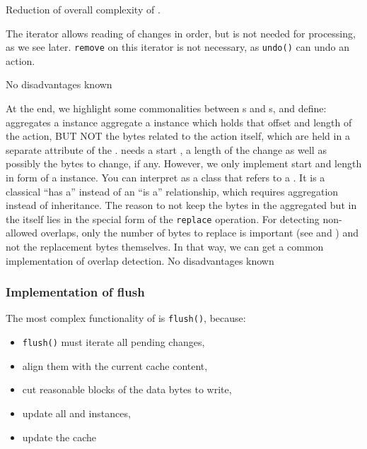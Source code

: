 {%
Reduction of overall complexity of \IMediumStore{}.

The iterator allows reading of changes in order, but is not needed for processing, as we see later. \texttt{remove} on this iterator is not necessary, as \texttt{undo()} can undo an action.
}
{%
No disadvantages known
}

At the end, we highlight some commonalities between \MediumAction{}s and \MediumRegion{}s, and define:
{%
\MediumAction{} aggregates a \MediumRegion{} instance
}
{%
\MediumAction{} aggregate a \MediumRegion{} instance which holds that offset and length of the action, BUT NOT the bytes related to the action itself, which are held in a separate attribute of the \MediumAction{}.
}
{%
\MediumAction{} needs a start \IMediumReference{}, a length of the change as well as possibly the bytes to change, if any. However, we only implement start and length in form of a \MediumRegion{} instance. You can interpret \MediumAction{} as a class that refers to a \MediumRegion{}. It is a classical ``has a'' instead of an ``is a'' relationship, which requires aggregation instead of inheritance. The reason to not keep the bytes in the aggregated \MediumRegion{} but in the \MediumAction{} itself lies in the special form of the  \texttt{replace} operation. For detecting non-allowed overlaps, only the number of bytes to replace is important (see  and ) and not the replacement bytes themselves. In that way, we can get a common implementation of overlap detection.
}
{%
No disadvantages known
}


\subsubsection{Implementation of flush}
\label{sec:flushing}

The most complex functionality of \IMediumStore{} is \texttt{flush()}, because:
\begin{itemize}
\item \texttt{flush()} must iterate all pending changes,
\item align them with the current cache content,
\item cut reasonable blocks of the data bytes to write,
\item update all \IMediumReference{} and \MediumAction{} instances,
\item update the cache
\end{itemize}

